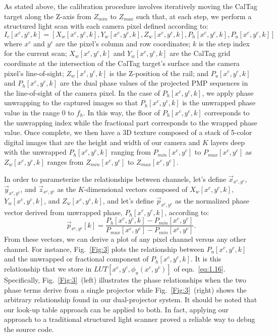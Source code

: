 \documentclass[]{spie}  %
\begin{document}
As stated above, the calibration procedure involves iteratively moving the CalTag target along the Z-axis from $Z_{min}$ to $Z_{max}$ such that, at each step, we perform a structured light scan with each camera pixel defined according to:
\begin{equation}
I_c[x^c, y^c, k] = [X_w[x^c, y^c, k], Y_w[x^c, y^c, k], Z_w[x^c, y^c, k], P_h[x^c, y^c, k], P_u[x^c, y^c, k]]
\label{calEqn}
\end{equation}
where $x^c$ and $y^c$ are the pixel's column and row coordinates; $k$ is the step index for the current scan; $X_w[x^c, y^c, k]$ and $Y_w[x^c, y^c, k]$ are the CalTag grid coordinate at the intersection of the CalTag target's surface and the camera pixel's line-of-sight; $Z_w[x^c, y^c, k]$ is the Z-position of the rail; and $P_u[x^c, y^c, k]$ and $P_h[x^c, y^c, k]$ are the dual phase values of the projected PMP sequences in the line-of-sight of the camera pixel.  In the case of $P_h[x^c, y^c, k]$, we apply phase unwrapping to the captured images so that $P_h[x^c, y^c, k]$ is the unwrapped phase value in the range 0 to $f_h$.  In this way, the floor of $P_h[x^c, y^c, k]$ corresponds to the unwrapping index while the fractional part corresponds to the wrapped phase value. Once complete, we then have a 3D texture composed of a stack of 5-color digital images that are the height and width of our camera and $K$ layers deep with the unwrapped $P_h[x^c, y^c, k]$ ranging from $P_{min}[x^c, y^c]$ to $P_{max}[x^c, y^c]$ as $Z_w[x^c, y^c, k]$ ranges from $Z_{min}[x^c, y^c]$ to $Z_{max}[x^c, y^c]$.

In order to parameterize the relationships between channels, let's define $\vec{x}_{x^c, y^c}$, $\vec{y}_{x^c, y^c}$, and $\vec{z}_{x^c, y^c}$ as the $K$-dimensional vectors composed of $X_w[x^c, y^c, k]$, $Y_w[x^c, y^c, k]$, and $Z_w[x^c, y^c, k]$, and let's define $\vec{p}_{x^c, y^c}$ as the normalized phase vector derived from unwrapped phase, $P_h[x^c, y^c, k]$, according to:
\begin{equation}
\vec{p}_{x^c, y^c}[k] = \frac{P_h[x^c, y^c, k] - P_{min}[x^c, y^c]}{P_{max}[x^c, y^c] - P_{min}[x^c, y^c]}.
\end{equation}
From these vectors, we can derive a plot of any pixel channel versus any other channel.  For instance, Fig.~\ref{Fig:3} plots the relationship between $P_u[x^c, y^c, k]$ and the unwrapped or fractional component of $P_h[x^c, y^c, k]$.  It is this relationship that we store in $LUT[x^c, y^c, \phi_u(x^c, y^c)]$ of eqn.~\eqref{eq:1.16}.  Specifically, Fig.~\ref{Fig:3}~(left) illustrates the phase relationships when the two phase terms derive from a single projector while Fig.~\ref{Fig:3}~(right) shows the arbitrary relationship found in our dual-projector system.  It should be noted that our look-up table approach can be applied to both. In fact, applying our approach to a traditional structured light scanner proved a reliable way to debug the source code.
\end{document}
